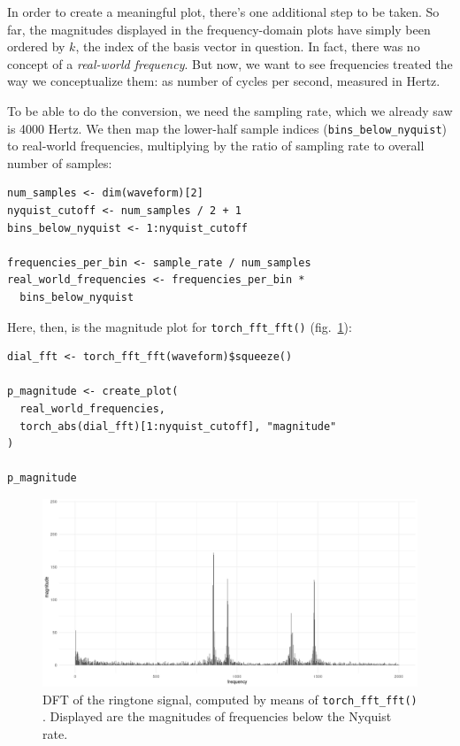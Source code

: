 \documentclass[
  letterpaper,
]{krantz}
\begin{document}
In order to create a meaningful plot, there's one additional step to be
taken. So far, the magnitudes displayed in the frequency-domain plots
have simply been ordered by \(k\), the index of the basis vector in
question. In fact, there was no concept of a \emph{real-world
frequency}. But now, we want to see frequencies treated the way we
conceptualize them: as number of cycles per second, measured in Hertz.

To be able to do the conversion, we need the sampling rate, which we
already saw is 4000 Hertz. We then map the lower-half sample indices
(\texttt{bins\_below\_nyquist}) to real-world frequencies, multiplying
by the ratio of sampling rate to overall number of samples:

\begin{verbatim}
num_samples <- dim(waveform)[2]
nyquist_cutoff <- num_samples / 2 + 1
bins_below_nyquist <- 1:nyquist_cutoff

frequencies_per_bin <- sample_rate / num_samples
real_world_frequencies <- frequencies_per_bin *
  bins_below_nyquist
\end{verbatim}

Here, then, is the magnitude plot for \texttt{torch\_fft\_fft()}
(fig.~\ref{fig-dft-dial-fft}):

\begin{verbatim}
dial_fft <- torch_fft_fft(waveform)$squeeze()

p_magnitude <- create_plot(
  real_world_frequencies,
  torch_abs(dial_fft)[1:nyquist_cutoff], "magnitude"
)

p_magnitude
\end{verbatim}

\begin{figure}[H]

{\centering \includegraphics{images/dft-dial-fft.png}

}

\caption{\label{fig-dft-dial-fft}DFT of the ringtone signal, computed by
means of \texttt{torch\_fft\_fft()} . Displayed are the magnitudes of
frequencies below the Nyquist rate.}

\end{figure}
\end{document}
